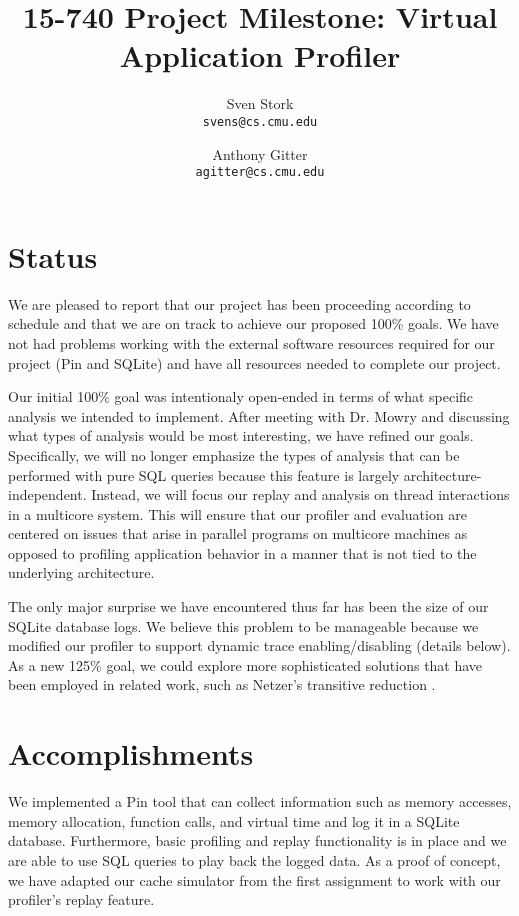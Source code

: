 \documentclass{article}
\title{15-740 Project Milestone: Virtual Application Profiler}
\author{Sven Stork \\ \texttt{svens@cs.cmu.edu}
	\and Anthony Gitter \\ \texttt{agitter@cs.cmu.edu}}
\begin{document}
\maketitle

\vspace{-0.25in}

\section{Status}
We are pleased to report that our project has been proceeding
according to schedule and that we are on track to achieve our
proposed 100\% goals.  We have not had problems working with the
external software resources required for our project (Pin and SQLite)
and have all resources needed to complete our project.

Our initial 100\% goal was intentionaly open-ended in terms of what
specific analysis we intended to implement.  After meeting with Dr.
Mowry and discussing what types of analysis would be most interesting,
we have refined our goals.  Specifically, we will no longer emphasize
the types of analysis that can be performed with pure SQL queries
because this feature is largely architecture-independent.  Instead,
we will focus our replay and analysis on thread interactions in a
multicore system.  This will ensure that our profiler and evaluation
are centered on issues that arise in parallel programs on multicore
machines as opposed to profiling application behavior in a manner that
is not tied to the underlying architecture.

The only major surprise we have encountered thus far has been the
size of our SQLite database logs.  We believe this problem to
be manageable because we modified our profiler to
support dynamic trace enabling/disabling
(details below).  As a new 125\% goal, we could explore more
sophisticated solutions that have been employed in related work,
such as Netzer's transitive reduction \cite{netzer1993optimal}.

\section{Accomplishments}
We implemented a Pin tool that can collect information such
as memory accesses, memory allocation, function calls, and virtual time
and log it in a SQLite database.  Furthermore, basic profiling and
replay functionality is in place and we are able to use SQL queries to
play back the logged data.  As a proof of concept, we have adapted our
cache simulator from the first assignment to work with our
profiler's replay feature.
\end{document}
